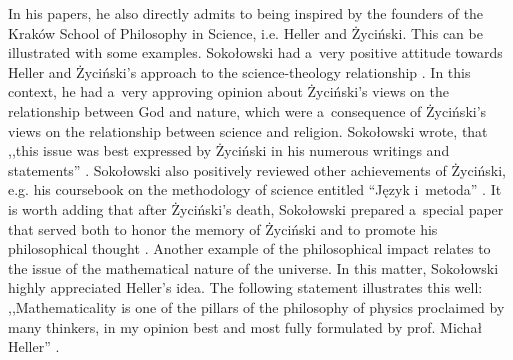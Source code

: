 \documentclass[%
  manuscript=article,
  year=2024,
  volume=77,
  doi=00000.000,
]{zfn}
\begin{document}
In his papers, he also directly admits to being inspired by the founders of the Kraków School of Philosophy in Science, i.e. Heller and Życiński. This can be illustrated with some examples. Sokołowski had a~very positive attitude towards Heller and Życiński's approach to the science-theology relationship 
\parencite[][]{Sokoowski1993Koscio}. %
 In this context, he had a~very approving opinion about Życiński's views on the relationship between God and nature, which were a~consequence of Życiński's views on the relationship between science and religion. Sokołowski wrote, that ,,this issue was best expressed by Życiński in his numerous writings and statements''
\parencite[][p.187]{Sokoowski2014Czy}. %
 Sokołowski also positively reviewed other achievements of Życiński, e.g. his coursebook on the methodology of science entitled ``Język i~metoda'' 
\parencite[][]{Sokoowski1983Jezyk}. %
 It is worth adding that after Życiński's death, Sokołowski prepared a~special paper that served both to honor the memory of Życiński and to promote his philosophical thought 
\parencite[][]{Sokoowski2015Granice}. %
 Another example of the philosophical impact relates to the issue of the mathematical nature of the universe. In this matter, Sokołowski highly appreciated Heller's idea. The following statement illustrates this well: ,,Mathematicality is one of the pillars of the philosophy of physics proclaimed by many thinkers, in my opinion best and most fully formulated by prof. Michał Heller''
\parencite[][p.47]{Sokoowski2011O}.%
\end{document}
